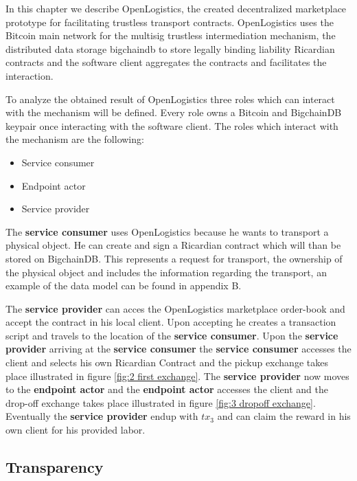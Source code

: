 In this chapter we describe OpenLogistics, the created decentralized  marketplace prototype for facilitating trustless transport contracts. OpenLogistics uses the Bitcoin main network for the multisig trustless intermediation mechanism, the distributed data storage bigchaindb to store legally binding liability Ricardian contracts and the software client aggregates the contracts and facilitates the interaction. \par
To analyze the obtained result of OpenLogistics three roles which can interact with the mechanism will be defined. Every role owns a Bitcoin and BigchainDB keypair once interacting with the software client. The roles which interact with the mechanism are the following:
\begin{itemize}
  \item Service consumer
  \item Endpoint actor
  \item Service provider
\end{itemize}
The \textbf{service consumer} uses OpenLogistics because he wants to transport a physical object. He can create and sign a Ricardian contract which will than be stored on BigchainDB. This represents a request for transport, the ownership of the physical object and includes the information regarding the transport, an example of the data model can be found in appendix B. \par

The \textbf{service provider} can acces the OpenLogistics marketplace order-book and accept the contract in his local client. Upon accepting he creates a transaction script and travels to the location of the \textbf{service consumer}. Upon the \textbf{service provider} arriving at the \textbf{service consumer} the \textbf{service consumer} accesses the client and selects his own Ricardian Contract and the pickup exchange takes place illustrated in figure \ref{fig:2 first exchange}. The \textbf{service provider} now moves to the \textbf{endpoint actor} and the \textbf{endpoint actor} accesses the client and the drop-off exchange takes place illustrated in figure \ref{fig:3 dropoff exchange}. Eventually the \textbf{service provider} endup with $tx_3$ and can claim the reward in his own client for his provided labor. \par

\subsection{Transparency}

